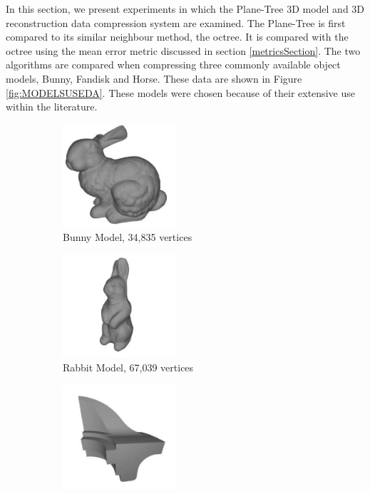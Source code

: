 
In this section, we present experiments in which the Plane-Tree 3D model and 3D reconstruction data compression system are examined. The Plane-Tree is first compared to its similar neighbour method, the octree. It is compared with the octree using the mean error metric discussed in section \ref{metricsSection}. The two algorithms are compared when compressing three commonly available object models, Bunny, Fandisk and Horse. These data are shown in Figure \ref{fig:MODELSUSEDA}. These models were chosen because of their extensive use within the literature. \\


\begin{figure}[t] 
        \begin{center}
 		\begin{subfigure}[b]{4.4cm}
 			   \centering
 			   \includegraphics[width=4.2cm]{images/experiments/test_data/models_used/bunny_34835}
 			   \captionsetup{justification=centering}
                \caption{Bunny Model, 34,835 vertices}
                \label{fig:MODELSUSEDA_BUNNY}
        \end{subfigure}%
        \begin{subfigure}[b]{4.4cm}
                \includegraphics[width=4.2cm]{images/experiments/test_data/models_used/rabbit_67039}
                \captionsetup{justification=centering}
                \caption{Rabbit Model, 67,039 vertices}
                \label{fig:MODELSUSEDA_RABBIT}
        \end{subfigure}
        \begin{subfigure}[b]{4.4cm}
                \includegraphics[width=4.2cm]{images/experiments/test_data/models_used/fandisk_6475}

\end{subfigure}
\end{center}
\end{figure}
